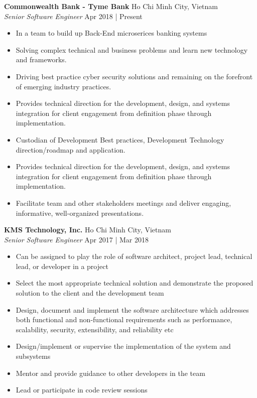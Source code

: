 \documentclass[a4paper]{article}
\begin{document}
\textbf{Commonwealth Bank - Tyme Bank} \hfill Ho Chi Minh City, Vietnam\\
\textit{Senior Software Engineer} \hfill Apr 2018 | Present\\
\vspace{-1mm}
\begin{itemize} \itemsep 1pt
	\item In a team to build up Back-End microserices banking systems
	\item Solving complex technical and business problems and learn new technology and frameworks.
	\item Driving best practice cyber security solutions and remaining on the forefront of emerging industry practices.
	\item Provides technical direction for the development, design, and systems integration for client engagement from definition phase through implementation.
	\item Custodian of Development Best practices, Development Technology direction/roadmap and application.
	\item Provides technical direction for the development, design, and systems integration for client engagement from definition phase through implementation.
	\item Facilitate team and other stakeholders meetings and deliver engaging, informative, well-organized presentations.
\end{itemize}
\textbf{KMS Technology, Inc.} \hfill Ho Chi Minh City, Vietnam\\
\textit{Senior Software Engineer} \hfill Apr 2017 | Mar 2018\\
\vspace{-1mm}
\begin{itemize} \itemsep 1pt
	\item Can be assigned to play the role of software architect, project lead, technical lead, or developer in a project
	\item Select the most appropriate technical solution and demonstrate the proposed solution to the client and the development team
	\item Design, document and implement the software architecture which addresses both functional and non-functional requirements such as performance, scalability, security, extensibility, and reliability etc
	\item Design/implement or supervise the implementation of the system and subsystems
	\item Mentor and provide guidance to other developers in the team
	\item Lead or participate in code review sessions
\end{itemize}
\end{document}
